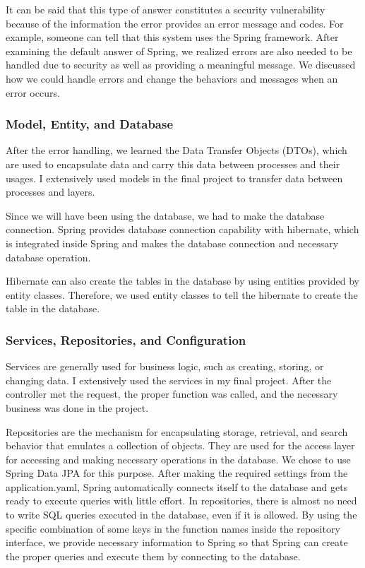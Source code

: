 It can be said that this type of answer constitutes a security vulnerability because of the information the error provides an error message and codes. For example, someone can tell that this system uses the Spring framework. After examining the default answer of Spring, we realized errors are also needed to be handled due to security as well as providing a meaningful message. We discussed how we could handle errors and change the behaviors and messages when an error occurs.

\subsubsection{Model, Entity, and Database}

After the error handling, we learned the Data Transfer Objects (DTOs), which are used to encapsulate data and carry this data between processes and their usages. I extensively used models in the final project to transfer data between processes and layers.

Since we will have been using the database, we had to make the database connection. Spring provides database connection capability with hibernate, which is integrated inside Spring and makes the database connection and necessary database operation. 

Hibernate can also create the tables in the database by using entities provided by entity classes. Therefore, we used entity classes to tell the hibernate to create the table in the database.

\subsubsection{Services, Repositories, and Configuration}

Services are generally used for business logic, such as creating, storing, or changing data. I extensively used the services in my final project. After the controller met the request, the proper function was called, and the necessary business was done in the project.

Repositories are the mechanism for encapsulating storage, retrieval, and search behavior that emulates a collection of objects. They are used for the access layer for accessing and making necessary operations in the database. We chose to use Spring Data JPA for this purpose. After making the required settings from the application.yaml, Spring automatically connects itself to the database and gets ready to execute queries with little effort. In repositories, there is almost no need to write SQL queries executed in the database, even if it is allowed. By using the specific combination of some keys in the function names inside the repository interface, we provide necessary information to Spring so that Spring can create the proper queries and execute them by connecting to the database.

